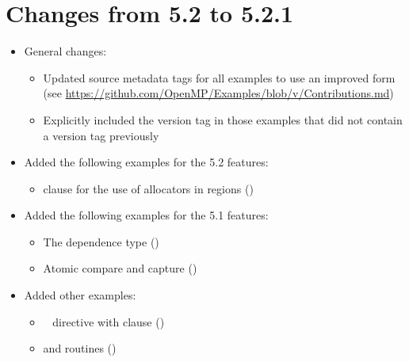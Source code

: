 \label{chap:history}

\section{Changes from 5.2 to 5.2.1}
\label{sec:history_52_to_521}

\begin{itemize}
\item General changes:
\begin{itemize}
\item Updated source metadata tags for all examples to use an improved form
 (see \href{https://github.com/OpenMP/Examples/blob/v\VER/Contributions.md}%
 {https://github.com/OpenMP/Examples/blob/v\VER/Contributions.md})
\item Explicitly included the version tag  in those 
 examples that did not contain a version tag previously
\end{itemize}

\item Added the following examples for the 5.2 features:
\begin{itemize}
  \item {} clause for the use of allocators in 
      regions ()
\end{itemize}
\item Added the following examples for the 5.1 features:
\begin{itemize}
  \item The  dependence type ()
  \item Atomic compare and capture ()
\end{itemize}
\item Added other examples:
\begin{itemize}
  \item {}~ directive with 
     clause ()
  \item {} and 
     routines ()
\end{itemize}


\end{itemize}

